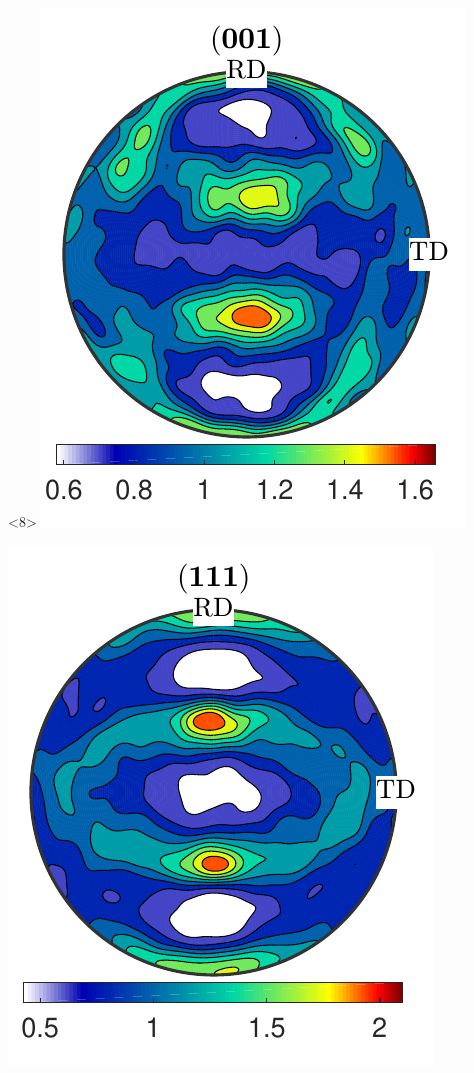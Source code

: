 \documentclass[compress]{beamer}
\begin{document}
\begin{frame}[fragile]
\begin{columns}
\begin{column}{0.29\textwidth}
                \begin{onlyenv}<8>
        \includegraphics[width=\textwidth]{pic/rolling001_5}

      \includegraphics[width=\textwidth]{pic/rolling111_5}
    \end{onlyenv}


\end{column}
\end{columns}
\end{frame}
\end{document}
